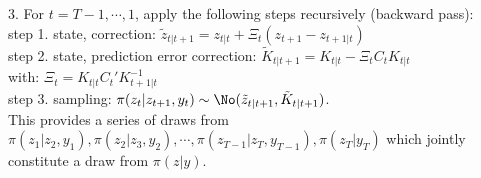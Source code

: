 3. For $t=T-1,\cdots,1$, apply the following steps recursively (backward pass): \\
\hspace*{4mm} step 1. state, correction: \hspace{35mm} $\tilde{z}_{t|t+1}=z_{t|t} + \Xi_t (z_{t+1}-z_{t+1|t})$ \vspace{0.5mm} \\
\hspace*{4mm} step 2. state, prediction error correction: \hspace{7.5mm} $\tilde{K}_{t|t+1}=K_{t|t}-\Xi_t C_t K_{t|t}$ \vspace{0.5mm} \\
\hspace*{4mm} with: $\Xi_t=K_{t|t} C_t' K_{t+1|t}^{-1}$ \\
\hspace*{4mm} step 3. sampling: \hspace{47mm} $\pi(z_t| z_{t+1}, y_t) \sim \No (\tilde{z}_{t|t+1},\tilde{K}_{t|t+1})$. \\

This provides a series of draws from $\pi(z_1| z_{2}, y_1), \pi(z_2| z_{3}, y_2), \cdots, \pi(z_{T-1}| z_{T}, y_{T-1}), \pi(z_T|y_T)$ which jointly constitute a draw from $\pi(z|y)$.


\newpage



